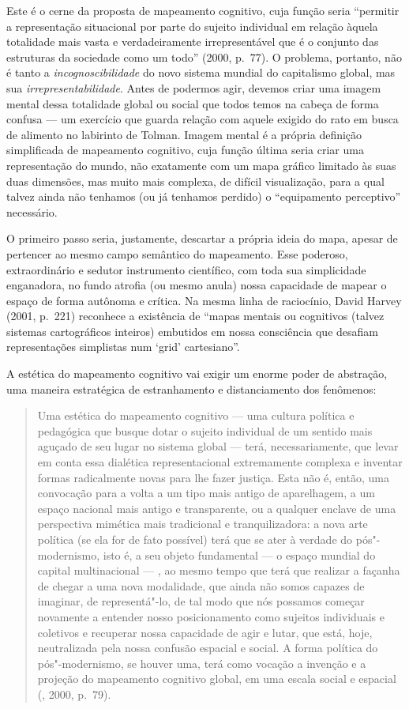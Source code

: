 Este é o cerne da proposta de mapeamento cognitivo, cuja função seria
``permitir a representação situacional por parte do sujeito individual
em relação àquela totalidade mais vasta e verdadeiramente
irrepresentável que é o conjunto das estruturas da sociedade como um
todo'' (2000, p.~77). O problema, portanto, não é tanto a
\emph{incognoscibilidade} do novo sistema mundial do capitalismo global,
mas sua \emph{irrepresentabilidade}. Antes de podermos agir, devemos criar uma
imagem mental dessa totalidade global ou social que todos temos na
cabeça de forma confusa --- um exercício que guarda relação com aquele
exigido do rato em busca de alimento no labirinto de Tolman. Imagem
mental é a própria definição simplificada de mapeamento cognitivo, cuja
função última seria criar uma representação do mundo, não exatamente com um mapa gráfico limitado às suas duas dimensões, mas muito mais complexa, de difícil visualização, para a qual talvez ainda não tenhamos (ou já tenhamos perdido) o ``equipamento perceptivo'' necessário.


O primeiro passo seria, justamente, descartar a própria ideia do mapa,
apesar de pertencer ao mesmo campo semântico do mapeamento.
Esse poderoso, extraordinário e sedutor instrumento científico, com toda
sua simplicidade enganadora, no fundo atrofia (ou mesmo anula) nossa
capacidade de mapear o espaço de forma autônoma e crítica. Na mesma
linha de raciocínio, David Harvey (2001, p.~221) reconhece a existência
de ``mapas mentais ou cognitivos (talvez sistemas cartográficos
inteiros) embutidos em nossa consciência que desafiam representações
simplistas num `grid' cartesiano''.

A estética do mapeamento cognitivo vai exigir um enorme poder de
abstração, uma maneira estratégica de estranhamento e distanciamento dos
fenômenos:

\begin{quote}
Uma estética do mapeamento cognitivo --- uma cultura política e
pedagógica que busque dotar o sujeito individual de um sentido mais
aguçado de seu lugar no sistema global --- terá, necessariamente, que
levar em conta essa dialética representacional extremamente complexa e
inventar formas radicalmente novas para lhe fazer justiça. Esta não é,
então, uma convocação para a volta a um tipo mais antigo de aparelhagem,
a um espaço nacional mais antigo e transparente, ou a qualquer enclave
de uma perspectiva mimética mais tradicional e tranquilizadora: a nova
arte política (se ela for de fato possível) terá que se ater à verdade
do pós"-modernismo, isto é, a seu objeto fundamental --- o espaço mundial
do capital multinacional --- , ao mesmo tempo que terá que realizar a
façanha de chegar a uma nova modalidade, que ainda não somos capazes de
imaginar, de representá"-lo, de tal modo que nós possamos começar
novamente a entender nosso posicionamento como sujeitos individuais e
coletivos e recuperar nossa capacidade de agir e lutar, que está, hoje,
neutralizada pela nossa confusão espacial e social. A forma política do
pós"-modernismo, se houver uma, terá como vocação a invenção e a projeção
do mapeamento cognitivo global, em uma escala social e espacial
(, 2000, p.~79).
\end{quote}

